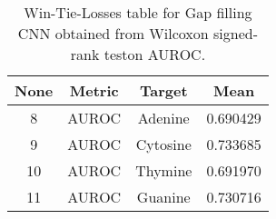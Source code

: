 \begin{table}[H]
\centering
\begin{tabular}{|c|c|c|c|}

 \textbf{None} & \textbf{Metric} & \textbf{Target} &  \textbf{Mean} \\
\hline

             8 &           AUROC &         Adenine &       0.690429 \\
\hline
             9 &           AUROC &        Cytosine &       0.733685 \\
\hline
            10 &           AUROC &         Thymine &       0.691970 \\
\hline
            11 &           AUROC &         Guanine &       0.730716 \\
\hline

\end{tabular}
\caption{Win-Tie-Losses table for Gap filling CNN obtained from Wilcoxon signed-rank teston AUROC.}
\label{tab:gap_filling_cnn_nucleotides_means}
\end{table}